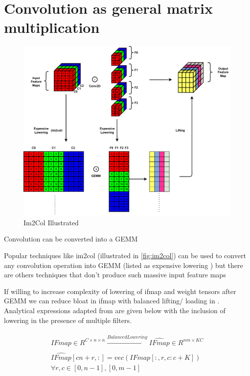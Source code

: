 \newpage

\section{Convolution as general matrix multiplication}
\label{chap:intro:conv_operation}

\begin{figure}[ht]
    \centering
    \includegraphics[scale=0.6]{fig/Im2Col.pdf}
    \caption{Im2Col Illustrated}
    \label{fig:im2col}
\end{figure}

Convolution can be converted into a \ac{GEMM}

Popular techniques like im2col (illustrated in \autoref{fig:im2col}) can be used
to convert any convolution operation into \ac{GEMM} (listed as expensive
lowering \cite{cafe_con_troll}) but there are others techniques that don't
produce such massive input feature maps


If willing to increase complexity of lowering of ifmap and weight tensors after
GEMM we can reduce bloat in ifmap with balanced lifting/ loading in
\cite{cafe_con_troll}. Analytical expressions adapted from \cite{cafe_con_troll}
are given below with the inclusion of lowering in the presence of multiple
filters.


\clearpage

\begin{align}
    \begin{gathered}
        IFmap \in R^{C\times n\times n} \xrightarrow[]{Balanced Lowering} \hat{IFmap} \in R^{nm\times KC} \\
        \hat{IFmap}[cn+r, :] = vec(IFmap[:, r, c:c+K]) \\
        \forall r,c \in [0, n-1], [0, m-1]
    \end{gathered}
    \label{math:balanced_lowering_ifmap}
\end{align}

